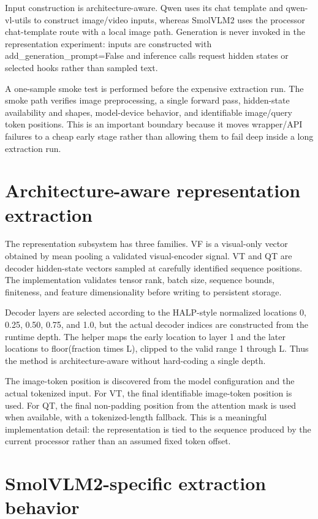 \documentclass[11pt,a4paper]{article}
\begin{document}
Input construction is architecture-aware. Qwen uses its chat template and qwen-vl-utils to construct image/video inputs, whereas SmolVLM2 uses the processor chat-template route with a local image path. Generation is never invoked in the representation experiment: inputs are constructed with add\_generation\_prompt=False and inference calls request hidden states or selected hooks rather than sampled text.

A one-sample smoke test is performed before the expensive extraction run. The smoke path verifies image preprocessing, a single forward pass, hidden-state availability and shapes, model-device behavior, and identifiable image/query token positions. This is an important boundary because it moves wrapper/API failures to a cheap early stage rather than allowing them to fail deep inside a long extraction run.

\section{Architecture-aware representation extraction}

The representation subsystem has three families. VF is a visual-only vector obtained by mean pooling a validated visual-encoder signal. VT and QT are decoder hidden-state vectors sampled at carefully identified sequence positions. The implementation validates tensor rank, batch size, sequence bounds, finiteness, and feature dimensionality before writing to persistent storage.

Decoder layers are selected according to the HALP-style normalized locations 0, 0.25, 0.50, 0.75, and 1.0, but the actual decoder indices are constructed from the runtime depth. The helper maps the early location to layer 1 and the later locations to floor(fraction times L), clipped to the valid range 1 through L. Thus the method is architecture-aware without hard-coding a single depth.

The image-token position is discovered from the model configuration and the actual tokenized input. For VT, the final identifiable image-token position is used. For QT, the final non-padding position from the attention mask is used when available, with a tokenized-length fallback. This is a meaningful implementation detail: the representation is tied to the sequence produced by the current processor rather than an assumed fixed token offset.

\section{SmolVLM2-specific extraction behavior}
\end{document}
